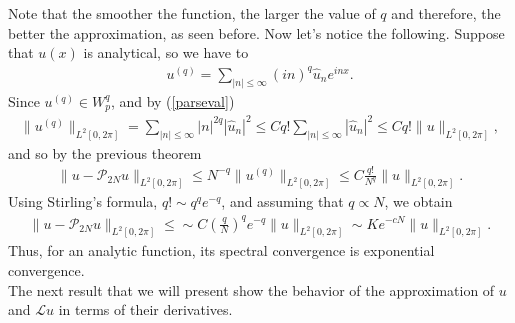     \noindent Note that the smoother the function, the larger the value of $q$ and therefore, the better the approximation, as seen before. Now let's notice the following. Suppose that $u(x)$ is analytical, so we have to
    	\begin{align*}
    		 u^{(q)} = \displaystyle 
    		 \sum_{ |n| \leq \infty} (in)^q \hat{u}_{n}e^{inx}.
    	\end{align*}
    Since $u^{(q)} \in W^q_p$, and by (\ref{parseval})
        \begin{align*}
            \|u^{(q)}\|_{L^2 [0, 2\pi]} = \sum_{ |n| \leq \infty} |n|^{2q} |\hat{u}_{n}|^2 \leq C q! \sum_{ |n| \leq \infty} |\hat{u}_{n}|^2 \leq C q! \| u \|_{L^2 [0, 2\pi]},
        \end{align*}
    and so by the previous theorem
        \begin{align*}
            \|u - \mathcal{P}_{2N} u \|_{L^2 [0, 2\pi]} \leq  N^{-q} \|u^{(q)}\|_{L^2 [0, 2\pi]} \leq C \frac{q!}{N^{q}} \| u \|_{L^2 [0, 2\pi]}.
        \end{align*}
    Using Stirling’s formula, $q! \sim q^q e^{-q}$, and assuming that $q \propto N$, we obtain
        \begin{align*}
            \|u - \mathcal{P}_{2N} u \|_{L^2 [0, 2\pi]} \leq \sim C \left(\frac{q}{N}\right)^q e^{-q} \| u \|_{L^2 [0, 2\pi]} \sim K e^{-c N} \| u \|_{L^2 [0, 2\pi]}.
        \end{align*}
    Thus, for an analytic function, its spectral convergence is exponential convergence. \\
    
    The next result that we will present show the behavior of the approximation of $u$ and $\mathcal{L}u$ in terms of their derivatives.	 	
   
